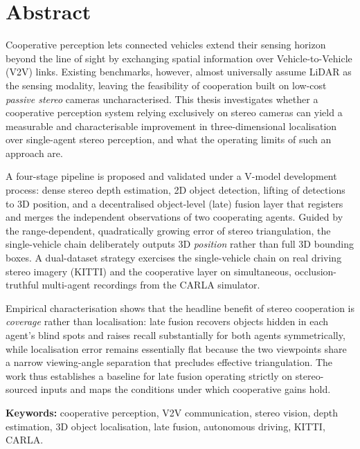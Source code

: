 \chapter*{Abstract}

Cooperative perception lets connected vehicles extend their sensing horizon
beyond the line of sight by exchanging spatial information over
Vehicle-to-Vehicle (V2V) links. Existing benchmarks, however, almost universally
assume LiDAR as the sensing modality, leaving the feasibility of cooperation
built on low-cost \emph{passive stereo} cameras uncharacterised. This thesis
investigates whether a cooperative perception system relying exclusively on
stereo cameras can yield a measurable and characterisable improvement in
three-dimensional localisation over single-agent stereo perception, and what the
operating limits of such an approach are.

A four-stage pipeline is proposed and validated under a V-model development
process: dense stereo depth estimation, 2D object detection, lifting of
detections to 3D position, and a decentralised object-level (late) fusion layer
that registers and merges the independent observations of two cooperating
agents. Guided by the range-dependent, quadratically growing error of stereo
triangulation, the single-vehicle chain deliberately outputs 3D \emph{position}
rather than full 3D bounding boxes. A dual-dataset strategy exercises the
single-vehicle chain on real driving stereo imagery (KITTI) and the cooperative
layer on simultaneous, occlusion-truthful multi-agent recordings from the CARLA
simulator.

Empirical characterisation shows that the headline benefit of stereo
cooperation is \emph{coverage} rather than localisation: late fusion recovers
objects hidden in each agent's blind spots and raises recall substantially for
both agents symmetrically, while localisation error remains essentially flat
because the two viewpoints share a narrow viewing-angle separation that
precludes effective triangulation. The work thus establishes a baseline for
late fusion operating strictly on stereo-sourced inputs and maps the conditions
under which cooperative gains hold.

\vspace{0.6cm}
\noindent\textbf{Keywords:} cooperative perception, V2V communication, stereo
vision, depth estimation, 3D object localisation, late fusion, autonomous
driving, KITTI, CARLA.
